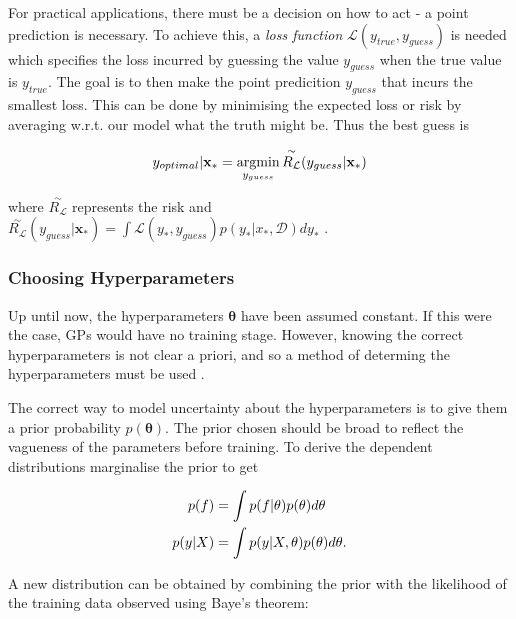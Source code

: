 \documentclass[12pt,a4paper]{report}
\theoremstyle{definition}
\begin{document}
For practical applications, there must be a decision on how to act - a point prediction is necessary. 
To achieve this, a \emph{loss function} $\mathcal{L}(y_{true}, y_{guess})$  is needed which specifies the loss incurred by guessing the value $y_{guess}$ when the true value is $y_{true}$. 
The goal is to then make the point predicition $y_{guess}$ that incurs the smallest loss.
This can be done by minimising the expected loss or risk by averaging w.r.t. our model what the truth might be.
Thus the best guess is 

\begin{equation}
	\centering
	y_{optimal} | \textbf{x}_{*} = \underset{y_{guess}}{\textrm{argmin}} \, \overset{\sim}{R_{\mathcal{L}}}(y_{guess} | \textbf{x}_{*})
\end{equation}

where $\overset{\sim}{R_{\mathcal{L}}}$ represents the risk and $\overset{\sim}{R_{\mathcal{L}}}(y_{guess} | \textbf{x}_{*}) = \int \mathcal{L}(y_{*}, y_{guess}) p(y_{*} | x_{*}, \mathcal{D}) dy_{*}$ \citep{RasmussenWilliams2006}.

\subsubsection{Choosing Hyperparameters}

Up until now, the hyperparameters $\boldsymbol{\theta}$ have been assumed constant.
If this were the case, GPs would have no training stage. 
However, knowing the correct hyperparameters is not clear a priori, and so a method of determing the hyperparameters must be used \citep{Kaiser2017}.

The correct way to model uncertainty about the hyperparameters is to give them a prior probability $p(\boldsymbol{\theta})$.
The prior chosen should be broad to reflect the vagueness of the parameters before training.
To derive the dependent distributions marginalise the prior to get

\begin{equation}
	\begin{aligned}
		\centering
		p(f) &= \int p(f | \theta) p(\theta) d\theta \\
		p(y | X) &= \int p(y | X, \theta) p(\theta) d\theta.
	\end{aligned}
\end{equation}

A new distribution can be obtained by combining the prior with the likelihood of the training data observed using Baye's theorem:
\end{document}
